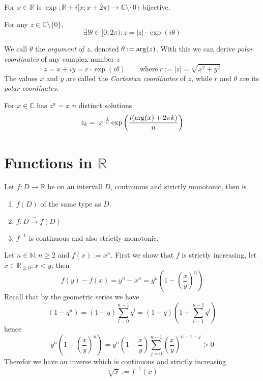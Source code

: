 \begin{theorem}
   For \(x \in \mathbb{R}\) is \(\exp: \mathbb{R} + i[x; x + 2\pi) \to \mathbb{C}\setminus\{0\}\) bijective.
\end{theorem}

\begin{theorem}
   For any \(z \in \mathbb{C}\setminus\{0\}\),
   \[\exists! \theta \in [0; 2\pi): z = \lvert z\rvert \cdot \exp(i \theta)\]
\end{theorem}
We call \(\theta\) the \emph{argument} of \(z\), denoted \(\theta := \operatorname{arg}(z)\).
With this we can derive \emph{polar coordinates} of any complex number \(z\)
\[z = x + iy = r \cdot \exp(i \theta) \qquad\text{where}~r := |z| = \sqrt{x^2 + y^2}\]
The values \(x\) and \(y\) are called the \emph{Cartesian coordinates} of \(z\), while \(r\) and \(\theta\) are its \emph{polar coordinates}.

%    

\begin{theorem}
   For \(x \in \mathbb{C}\) has \(z^n = x\) \(n\) distinct solutions
   \[z_k = \lvert x\rvert^\frac{1}{n} \exp\left(\frac{i(\operatorname{arg}(x) + 2\pi k)}{n}\right)\]
\end{theorem}

\newpage

\section{Functions in \texorpdfstring{\(\mathbb{R}\)}{R}}
\begin{theorem}
   Let \(f: D \to \mathbb{R}\) be on an intervall \(D\), continuous and strictly monotonic, then is
   \begin{enumerate}[label=\roman*, align=Center]
      \item \(f(D)\) of the same type as \(D\).
      \item \(f:D \xrightarrow{\sim} f(D)\)
      \item \(f^{-1}\) is continuous and also strictly monotonic.
   \end{enumerate}
\end{theorem}
\begin{example}
   Let \(n \in \mathbb{N}: n \geq 2\) and \(f(x) := x^n\).
   First we show that \(f\) is strictly increasing, let \(x \in \mathbb{R}_{\geq 0}: x < y\), then
   \[f(y) - f(x) = y^n - x^n = y^n \left(1 - \left(\frac{x}{y}\right)^n\right)\]
   Recall that by the geometric series we have
   \[(1- q^n) = (1-q) \sum_{l=0}^{n-1} q^l = (1-q)\left(1 + \sum_{l=1}^{n-1} q^l\right)\]
   hence
   \[y^n \left(1 - \left(\frac{x}{y}\right)^n\right) = y^n \left(1 - \frac{x}{y}\right) \sum_{j=0}^{n-1} \left(\frac{x}{y}\right)^{n-1-j} > 0\]
   Therefor we have an inverse which is continuous and strictly increasing
   \[\sqrt[n]{x} := f^{-1}(x)\]
\end{example}

